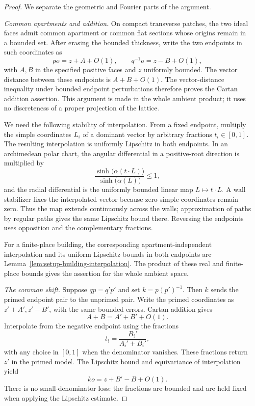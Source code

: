 \begin{proof}
We separate the geometric and Fourier parts of the argument.

\emph{Common apartments and addition.}
On compact transverse patches, the two ideal faces admit common
apartment or common flat sections whose origins remain in a bounded
set. After erasing the bounded thickness, write the two endpoints in
such coordinates as
\[
 po=z+A+O(1),\qquad q^{-1}o=z-B+O(1),
\]
with $A,B$ in the specified positive faces and $z$ uniformly bounded.
The vector distance between these endpoints is $A+B+O(1)$.
The vector-distance inequality under bounded endpoint perturbations
therefore proves the Cartan addition assertion. This argument is made
in the whole ambient product; it uses no discreteness of a proper
projection of the lattice.

We need the following stability of interpolation. From a fixed
endpoint, multiply the simple coordinates $L_i$ of a dominant vector
by arbitrary fractions $t_i\in[0,1]$. The resulting interpolation is
uniformly Lipschitz in both endpoints. In an archimedean polar chart,
the angular differential in a positive-root direction is multiplied by
\[
 \frac{\sinh\bigl(\alpha(t\cdot L)\bigr)}
      {\sinh\bigl(\alpha(L)\bigr)}\leq 1,
\]
and the radial differential is the uniformly bounded linear map
$L\mapsto t\cdot L$. A wall stabilizer fixes the interpolated vector
because zero simple coordinates remain zero. Thus the map extends
continuously across the walls; approximation of paths by regular paths
gives the same Lipschitz bound there. Reversing the endpoints uses
opposition and the complementary fractions.

For a finite-place building, the corresponding apartment-independent
interpolation and its uniform Lipschitz bounds in both endpoints are
Lemma~\ref{lem:setup-building-interpolation}. The product of these
real and finite-place bounds gives the assertion for the whole ambient
space.

\emph{The common shift.}
Suppose $qp=q'p'$ and set $k=p(p')^{-1}$. Then $k$ sends the primed
endpoint pair to the unprimed pair. Write the primed coordinates as
$z'+A',z'-B'$, with the same bounded errors. Cartan addition gives
\[
 A+B=A'+B'+O(1).
\]
Interpolate from the negative endpoint using the fractions
\[
 t_i=\frac{B_i'}{A_i'+B_i'},
\]
with any choice in $[0,1]$ when the denominator vanishes. These
fractions return $z'$ in the primed model. The Lipschitz bound and
equivariance of interpolation yield
\begin{equation}
 ko=z+B'-B+O(1).
 \label{eq:transfer-common-shift}
\end{equation}
There is no small-denominator loss: the fractions are bounded and are
held fixed when applying the Lipschitz estimate.


\end{proof}
